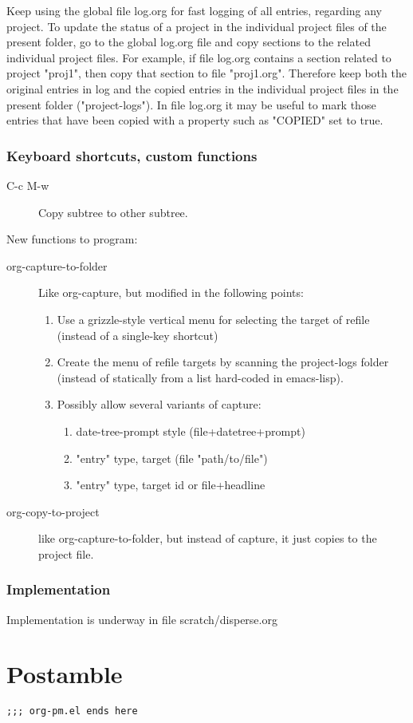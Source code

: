 \documentclass{article}
\begin{document}
Keep using the global file log.org for fast logging of all entries, regarding any project.  To update the status of a project in the individual project files of the present folder, go to the global log.org file and copy sections to the related individual project files.  For example, if file log.org contains a section related to project "proj1", then copy that section to file "proj1.org".  Therefore keep both the original entries in log and the copied entries in the individual project files in the present folder ("project-logs").  In file log.org it may be useful to mark those entries that have been copied with a property such as "COPIED" set to true.

\subsubsection{Keyboard shortcuts, custom functions}
\label{sec-5-2-3}

\begin{description}
\item[{C-c M-w}] Copy subtree to other subtree.
\end{description}

New functions to program:

\begin{description}
\item[{org-capture-to-folder}] Like org-capture, but modified in the following points:
\begin{enumerate}
\item Use a grizzle-style vertical menu for selecting the target of refile (instead of a single-key shortcut)
\item Create the menu of refile targets by scanning the project-logs folder (instead of statically from a list hard-coded in emacs-lisp).
\item Possibly allow several variants of capture:
\begin{enumerate}
\item date-tree-prompt style (file+datetree+prompt)
\item "entry" type, target (file "path/to/file")
\item "entry" type, target id or file+headline
\end{enumerate}
\end{enumerate}
\item[{org-copy-to-project}] like org-capture-to-folder, but instead of capture, it just copies to the project file.
\end{description}

\subsubsection{Implementation}
\label{sec-5-2-4}

Implementation is underway in file scratch/disperse.org

\section{Postamble}
\label{sec-6}

\begin{verbatim}
;;; org-pm.el ends here
\end{verbatim}
\end{document}
